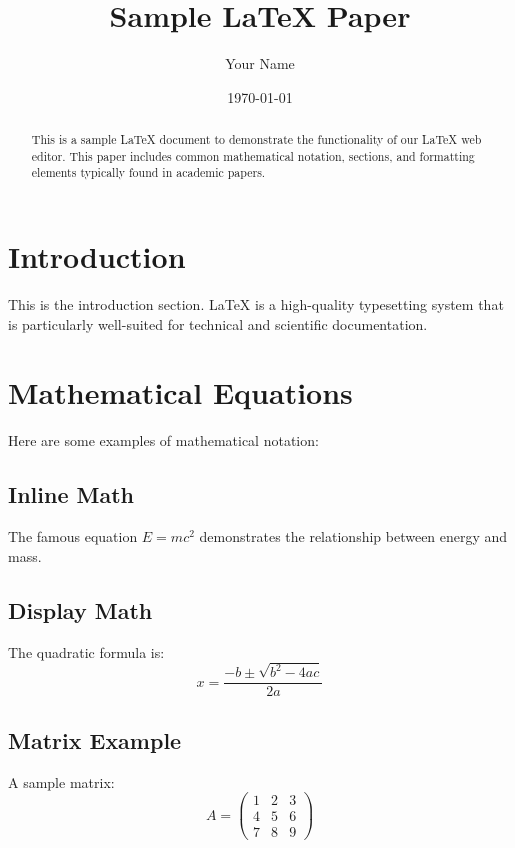 \documentclass{article}
\title{Sample LaTeX Paper}
\author{Your Name}
\date{\today}
\begin{document}
\maketitle

\begin{abstract}
This is a sample LaTeX document to demonstrate the functionality of our LaTeX web editor. This paper includes common mathematical notation, sections, and formatting elements typically found in academic papers.
\end{abstract}

\section{Introduction}

This is the introduction section. LaTeX is a high-quality typesetting system that is particularly well-suited for technical and scientific documentation.

\section{Mathematical Equations}

Here are some examples of mathematical notation:

\subsection{Inline Math}
The famous equation $E = mc^2$ demonstrates the relationship between energy and mass.

\subsection{Display Math}
The quadratic formula is:
\begin{equation}
x = \frac{-b \pm \sqrt{b^2 - 4ac}}{2a}
\end{equation}

\subsection{Matrix Example}
A sample matrix:
\begin{equation}
A = \begin{pmatrix}
1 & 2 & 3 \\
4 & 5 & 6 \\
7 & 8 & 9
\end{pmatrix}
\end{equation}
\end{document}
